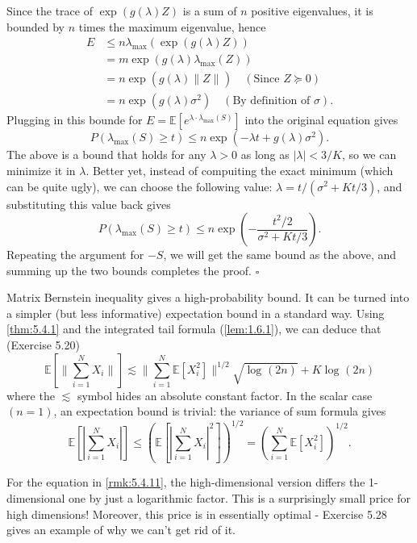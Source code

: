 Since the trace of $\exp{(g(\lambda)Z)}$ is a sum of $n$ positive eigenvalues, it is bounded by $n$ times the 
maximum eigenvalue, hence 
\begin{align*}
	E 
	&\leq n \lambda_{\mathrm{max}}(\exp{(g(\lambda)Z)}) \\
	&= m \exp{(g(\lambda) \lambda_{\mathrm{max}}(Z))} \\
	&= n \exp{(g(\lambda) \lVert Z \rVert_{})} \quad (\text{Since } Z \succeq 0) \\
	&= n \exp{(g(\lambda)\sigma^2)} \quad (\text{By definition of } \sigma).
\end{align*}
Plugging in this bounde for $E = \mathbb{E}[e^{\lambda \cdot \lambda_{\mathrm{max}}(S)}]$ into the original 
equation gives
\[ P(\lambda_{\mathrm{max}}(S) \geq t) \leq n \exp{(-\lambda t + g(\lambda)\sigma^2)}. \]
The above is a bound that holds for any $\lambda > 0$ as long as $|\lambda| < 3/K$, so we can minimize it in 
$\lambda$. Better yet, instead of compuiting the exact minimum (which can be quite ugly), we can choose the 
following value: $\lambda = t / (\sigma^2 + Kt / 3)$, and substituting this value back gives 
\[ P(\lambda_{\mathrm{max}}(S) \geq t) \leq n \exp{\left( -\frac{t^2 / 2}{\sigma^2 + Kt / 3} \right)}. \]
Repeating the argument for $-S$, we will get the same bound as the above, and summing up the two bounds 
completes the proof. $\square$

\begin{remark}
\label{rmk:5.4.11}
Matrix Bernstein inequality gives a high-probability bound. It can be turned into a simpler (but less 
informative) expectation bound in a standard way. Using \cref{thm:5.4.1} and the integrated tail formula 
(\cref{lem:1.6.1}), we can deduce that (Exercise 5.20)
\[ \mathbb{E}\left[ \lVert \sum_{i = 1}^{N} X_i \rVert_{} \right] 
\lesssim \lVert \sum_{i = 1}^{N} \mathbb{E}[X_i^2] \rVert_{}^{1/2} \sqrt{\log_{}{(2n)}} + K \log_{}{(2n)} \]
where the $\lesssim$ symbol hides an absolute constant factor. In the scalar case $(n = 1)$, an expectation 
bound is trivial: the variance of sum formula gives 
\[ \mathbb{E}\left[ \left| \sum_{i = 1}^{N} X_i \right| \right] 
\leq \left( \mathbb{E}\left[ \left| \sum_{i = 1}^{N} X_i \right|^2 \right] \right)^{1/2} 
= \left( \sum_{i = 1}^{N} \mathbb{E}[X_i^2] \right)^{1/2}. \]
\end{remark}

\begin{remark}
For the equation in \cref{rmk:5.4.11}, the high-dimensional version differs the 1-dimensional one by just 
a logarithmic factor. This is a surprisingly small price for high dimensions! Moreover, this price is in 
essentially optimal - Exercise 5.28 gives an example of why we can't get rid of it.
\end{remark}


